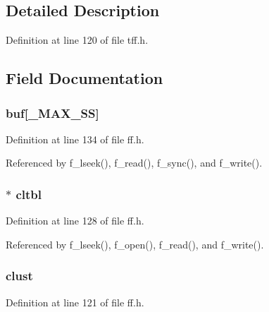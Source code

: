 \subsection{Detailed Description}


Definition at line 120 of file tff.\-h.



\subsection{Field Documentation}
\hypertarget{struct_f_i_l_a8b83239f9e2ae594c0cbc75d23ddff89}{
\subsubsection[{buf}]{ buf\mbox{[}{\bf \-\_\-\-M\-A\-X\-\_\-\-S\-S}\mbox{]}}}\label{struct_f_i_l_a8b83239f9e2ae594c0cbc75d23ddff89}


Definition at line 134 of file ff.\-h.



Referenced by f\-\_\-lseek(), f\-\_\-read(), f\-\_\-sync(), and f\-\_\-write().

\hypertarget{struct_f_i_l_a807e335a4d92639456ac4273cb0de4cb}{
\subsubsection[{cltbl}]{$\ast$ cltbl}}\label{struct_f_i_l_a807e335a4d92639456ac4273cb0de4cb}


Definition at line 128 of file ff.\-h.



Referenced by f\-\_\-lseek(), f\-\_\-open(), f\-\_\-read(), and f\-\_\-write().

\hypertarget{struct_f_i_l_ac134c1b4645be670eb5207032e714616}{
\subsubsection[{clust}]{ clust}}\label{struct_f_i_l_ac134c1b4645be670eb5207032e714616}


Definition at line 121 of file ff.\-h.



